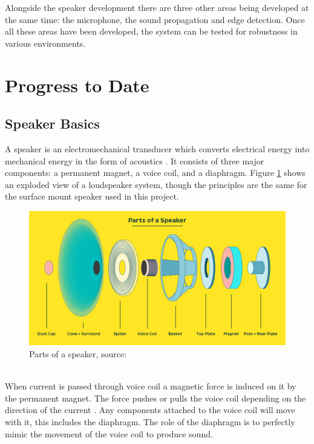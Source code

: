 \documentclass[12pt, a4paper]{article}
\begin{document}
Alongside the speaker development there are three other areas being developed at the same time: the microphone, the sound propagation and edge detection. Once all these areas have been developed, the system can be tested for robustness in various environments. 
\pagebreak
\section{Progress to Date}
\subsection{Speaker Basics}
A speaker is an electromechanical transducer which converts electrical energy into mechanical energy in the form of acoustics \cite{whatLoudspeaker}. It consists of three major components: a permanent magnet, a voice coil, and a diaphragm. Figure \ref{fig:speakerExplodedView} shows an exploded view of a loudspeaker system, though the principles are the same for the surface mount speaker used in this project.\\
\begin{figure}[!htb]
	\hfill\includegraphics[width=\textwidth]{./Figures/parts_of_a_speaker}\hspace*{\fill}
	\caption{Parts of a speaker, source: \cite{howSpeaker}}
	\label{fig:speakerExplodedView}
\end{figure}\\
When current is passed through voice coil a magnetic force is induced on it by the permanent magnet. The force pushes or pulls the voice coil depending on the direction of the current \cite{whatLoudspeaker}. Any components attached to the voice coil will move with it, this includes the diaphragm. The role of the diaphragm is to perfectly mimic the movement of the voice coil to produce sound.\\
\end{document}
